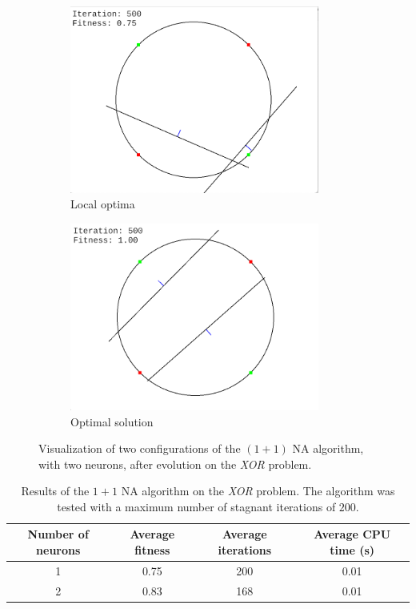\begin{figure}
    \centering
    \begin{subfigure}{0.45\textwidth}
        \centering
        \includegraphics[width=0.9\textwidth]{Pictures/na-xor-localopt}
       \caption{Local optima}
    \end{subfigure}\hfill
    \begin{subfigure}{0.45\textwidth}
        \centering
        \includegraphics[width=0.9\textwidth]{Pictures/na-xor-opt}
        \caption{Optimal solution}
    \end{subfigure}
    \caption{Visualization of two configurations of the $(1 + 1)$ NA algorithm, with two neurons, after evolution on the \textit{XOR} problem.}
    \label{fig:na_xor_visual}
\end{figure}

\begin{table}
    \caption{Results of the $1 + 1$ NA algorithm on the \textit{XOR} problem. The algorithm was tested with a maximum number of stagnant iterations of $200$.}
    \centering
    \label{tab:na_xor}
    \begin{tabular}{ |c|c|c|c| }
        \hline
        Number of neurons & Average fitness & Average iterations & Average CPU time (s) \\
        \hline
        1 & 0.75 & 200 & 0.01 \\
        \hline
        2 & 0.83 & 168 & 0.01 \\
        \hline\hline
    \end{tabular}
\end{table}

